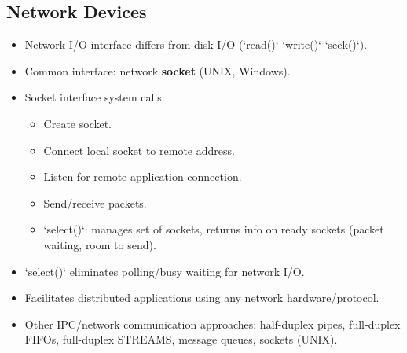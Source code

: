 \subsection{Network Devices}
\begin{itemize}
    \item Network I/O interface differs from disk I/O (`read()`-`write()`-`seek()`).
    \item Common interface: network \textbf{socket} (UNIX, Windows).
    \item Socket interface system calls:
    \begin{itemize}
        \item Create socket.
        \item Connect local socket to remote address.
        \item Listen for remote application connection.
        \item Send/receive packets.
        \item `select()`: manages set of sockets, returns info on ready sockets (packet waiting, room to send).
    \end{itemize}
    \item `select()` eliminates polling/busy waiting for network I/O.
    \item Facilitates distributed applications using any network hardware/protocol.
    \item Other IPC/network communication approaches: half-duplex pipes, full-duplex FIFOs, full-duplex STREAMS, message queues, sockets (UNIX).
\end{itemize}


